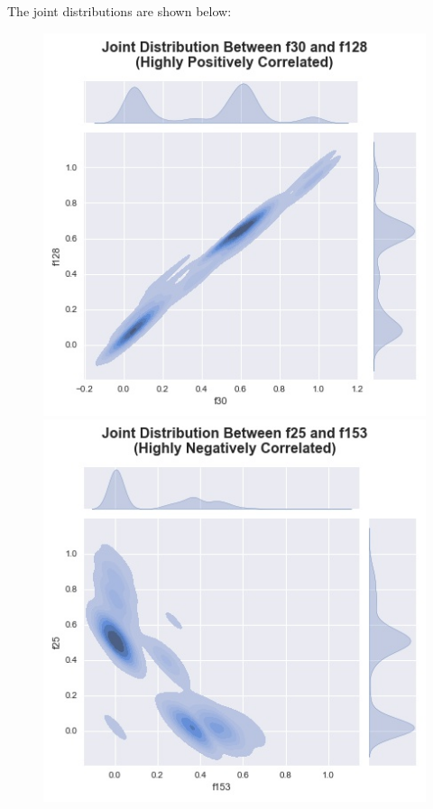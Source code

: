 \documentclass[12pt]{article}
\begin{document}
The joint distributions are shown below:

\begin{figure}[!htb]
  \includegraphics[width=\linewidth]{figures/joint_marginals_high_corr.jpg}
\endminipage\hfill
{}
  \includegraphics[width=\linewidth]{figures/joint_marginals_neg_corr.jpg}

\end{figure}
\end{document}
